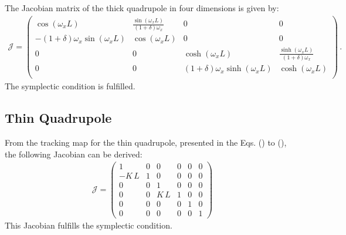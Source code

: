 The Jacobian matrix of the thick quadrupole in four dimensions is given by:
%
\begin{align}
  \mathcal{J} = 
\left(
\begin{array}{cccc}
 \cos ( \omega_x L ) &  \frac{\sin (\omega_x L)}{(1+\delta) \omega_x } & 0 & 0 \\
 -(1+ \delta) \omega_x  \sin (\omega_x L) & \cos (\omega_x L) & 0 & 0 \\
 0 & 0 & \cosh (\omega_x L) & \frac{\sinh (\omega_x L)}{(1+\delta) \omega_x } \\
 0 & 0 & (1+\delta) \omega_x  \sinh (\omega_x L) & \cosh (\omega_x L) \\
\end{array}
\right) \, .
\end{align}
The symplectic condition is fulfilled.


 
\subsection{Thin Quadrupole}

From the tracking map for the thin quadrupole, presented in the Eqs. () to (), the following Jacobian can be derived:
\begin{align}
  \mathcal{J} = 
\begin{pmatrix} 1 & 0 & 0 & 0 & 0 & 0 \\ -K \, L & 1 & 0 & 0 & 0 & 0 \\ 0 & 0 & 1 & 0 & 0 & 0 \\ 0 & 0 & K \, L & 1 & 0 & 0 \\ 0 & 0 & 0 & 0 & 1 & 0 \\ 0 & 0 & 0 & 0 & 0 & 1   \end{pmatrix}
\end{align}
This Jacobian fulfills the symplectic condition. 

\newpage
